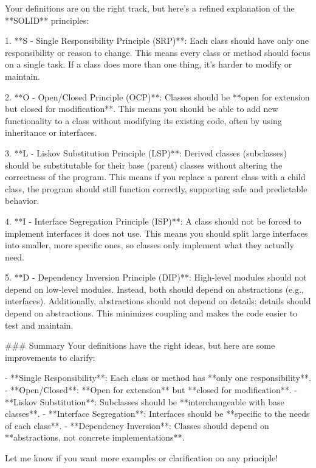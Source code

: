 Your definitions are on the right track, but here’s a refined explanation of the **SOLID** principles:

1. **S - Single Responsibility Principle (SRP)**:  
   Each class should have only one responsibility or reason to change. This means every class or method should focus on a single task. If a class does more than one thing, it’s harder to modify or maintain.

2. **O - Open/Closed Principle (OCP)**:  
   Classes should be **open for extension but closed for modification**. This means you should be able to add new functionality to a class without modifying its existing code, often by using inheritance or interfaces.

3. **L - Liskov Substitution Principle (LSP)**:  
   Derived classes (subclasses) should be substitutable for their base (parent) classes without altering the correctness of the program. This means if you replace a parent class with a child class, the program should still function correctly, supporting safe and predictable behavior.

4. **I - Interface Segregation Principle (ISP)**:  
   A class should not be forced to implement interfaces it does not use. This means you should split large interfaces into smaller, more specific ones, so classes only implement what they actually need.

5. **D - Dependency Inversion Principle (DIP)**:  
   High-level modules should not depend on low-level modules. Instead, both should depend on abstractions (e.g., interfaces). Additionally, abstractions should not depend on details; details should depend on abstractions. This minimizes coupling and makes the code easier to test and maintain.

### Summary
Your definitions have the right ideas, but here are some improvements to clarify:

- **Single Responsibility**: Each class or method has **only one responsibility**.
- **Open/Closed**: **Open for extension** but **closed for modification**.
- **Liskov Substitution**: Subclasses should be **interchangeable with base classes**.
- **Interface Segregation**: Interfaces should be **specific to the needs of each class**.
- **Dependency Inversion**: Classes should depend on **abstractions, not concrete implementations**.

Let me know if you want more examples or clarification on any principle!
